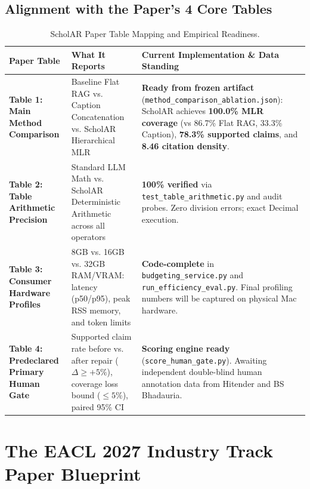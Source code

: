 \documentclass[11pt,a4paper]{article}
\begin{document}
\subsection{Alignment with the Paper's 4 Core Tables}
\begin{table}[h]
\centering
\small
\begin{tabularx}{\textwidth}{lp{5.2cm}X}
\toprule
\textbf{Paper Table} & \textbf{What It Reports} & \textbf{Current Implementation \& Data Standing} \\
\midrule
\textbf{Table 1: Main Method Comparison} & Baseline Flat RAG vs. Caption Concatenation vs. ScholAR Hierarchical MLR & \textbf{Ready from frozen artifact} (\texttt{method\_comparison\_ablation.json}): ScholAR achieves \textbf{100.0\% MLR coverage} (vs 86.7\% Flat RAG, 33.3\% Caption), \textbf{78.3\% supported claims}, and \textbf{8.46 citation density}. \\
\addlinespace
\textbf{Table 2: Table Arithmetic Precision} & Standard LLM Math vs. ScholAR Deterministic Arithmetic across all operators & \textbf{100\% verified} via \texttt{test\_table\_arithmetic.py} and audit probes. Zero division errors; exact Decimal execution. \\
\addlinespace
\textbf{Table 3: Consumer Hardware Profiles} & 8GB vs. 16GB vs. 32GB RAM/VRAM: latency (p50/p95), peak RSS memory, and token limits & \textbf{Code-complete} in \texttt{budgeting\_service.py} and \texttt{run\_efficiency\_eval.py}. Final profiling numbers will be captured on physical Mac hardware. \\
\addlinespace
\textbf{Table 4: Predeclared Primary Human Gate} & Supported claim rate before vs. after repair ($\Delta \ge +5\%$), coverage loss bound ($\le 5\%$), paired 95\% CI & \textbf{Scoring engine ready} (\texttt{score\_human\_gate.py}). Awaiting independent double-blind human annotation data from Hitender and BS Bhadauria. \\
\bottomrule
\end{tabularx}
\caption{ScholAR Paper Table Mapping and Empirical Readiness.}
\end{table}

\vspace{12pt}

\section{The EACL 2027 Industry Track Paper Blueprint}
\end{document}
